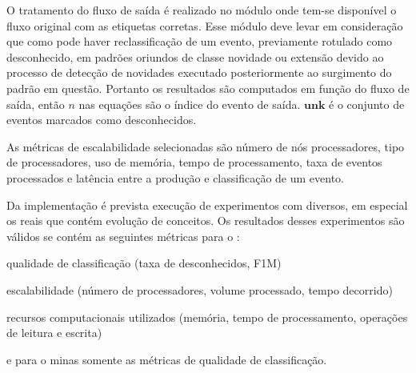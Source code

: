 
O tratamento do fluxo de saída é realizado no módulo \sink onde tem-se
disponível o fluxo original com as etiquetas corretas.
Esse módulo deve levar em consideração que
como pode haver reclassificação de um evento, previamente rotulado como
desconhecido, em padrões oriundos de classe novidade ou extensão devido ao
processo de detecção de novidades executado posteriormente ao surgimento
do padrão em questão.
Portanto os resultados são computados em função do fluxo de saída, então $n$ nas
equações são o índice do evento de saída.
$\mathbf{unk}$ é o conjunto de eventos marcados como desconhecidos.




As métricas de escalabilidade selecionadas são número de nós processadores, tipo
de processadores, uso de memória, tempo de processamento, taxa de eventos
processados e latência entre a produção e classificação de um evento.

Da implementação \mfog é prevista execução de experimentos com \datasets
diversos, em especial os \datasets reais que contém evolução de conceitos.
Os resultados desses experimentos são válidos se contém as seguintes métricas
para o \mfog: \begin{enumerate*}[label={\alph*)}]
  \item qualidade de classificação (taxa de desconhecidos, F1M)
  \item escalabilidade (número de processadores, volume processado, tempo decorrido)
  \item recursos computacionais utilizados (memória, tempo de processamento, operações de leitura e escrita)
\end{enumerate*}
e para o minas somente as métricas de qualidade de classificação.

